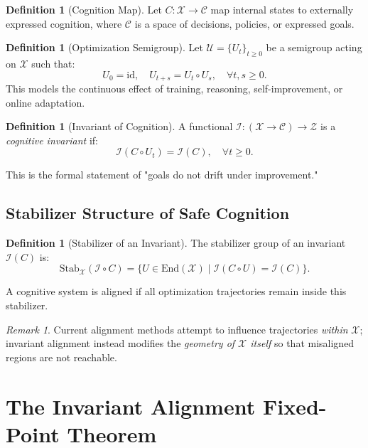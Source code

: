 \documentclass[11pt,a4paper]{article}
\theoremstyle{plain}
\theoremstyle{definition}
\newtheorem{definition}[theorem]{Definition}
\theoremstyle{remark}
\newtheorem{remark}[theorem]{Remark}
\numberwithin{equation}{section}
\newcommand{\I}{\mathcal{I}}
\newcommand{\X}{\mathcal{X}}
\newcommand{\C}{\mathcal{C}}
\newcommand{\U}{\mathcal{U}}
\newcommand{\Stab}{\text{Stab}}
\begin{document}
\begin{definition}[Cognition Map]
Let $C : \X \to \C$ map internal states to externally expressed cognition, where $\C$ is a space of decisions, policies, or expressed goals.
\end{definition}

\begin{definition}[Optimization Semigroup]
Let $\U = \{U_t\}_{t \ge 0}$ be a semigroup acting on $\X$ such that:
\[
U_0 = \mathrm{id}, \quad U_{t+s} = U_t \circ U_s, \quad \forall t,s \ge 0.
\]
This models the continuous effect of training, reasoning, self-improvement, or online adaptation.
\end{definition}

\begin{definition}[Invariant of Cognition]
A functional $\I : (\X \to \C) \to \mathcal{Z}$ is a \emph{cognitive invariant} if:
\[
\I(C \circ U_t) = \I(C), \quad \forall t \ge 0.
\]
\end{definition}

This is the formal statement of "goals do not drift under improvement."

\subsection{Stabilizer Structure of Safe Cognition}

\begin{definition}[Stabilizer of an Invariant]
The stabilizer group of an invariant $\I(C)$ is:
\[
\Stab_\X(\I \circ C) = \{ U \in \mathrm{End}(\X) \mid \I(C \circ U) = \I(C) \}.
\]
\end{definition}

A cognitive system is aligned if all optimization trajectories remain inside this stabilizer.

\begin{remark}
Current alignment methods attempt to influence trajectories \emph{within} $\X$; invariant alignment instead modifies the \emph{geometry of $\X$ itself} so that misaligned regions are not reachable.
\end{remark}

\section{The Invariant Alignment Fixed-Point Theorem}
\end{document}
